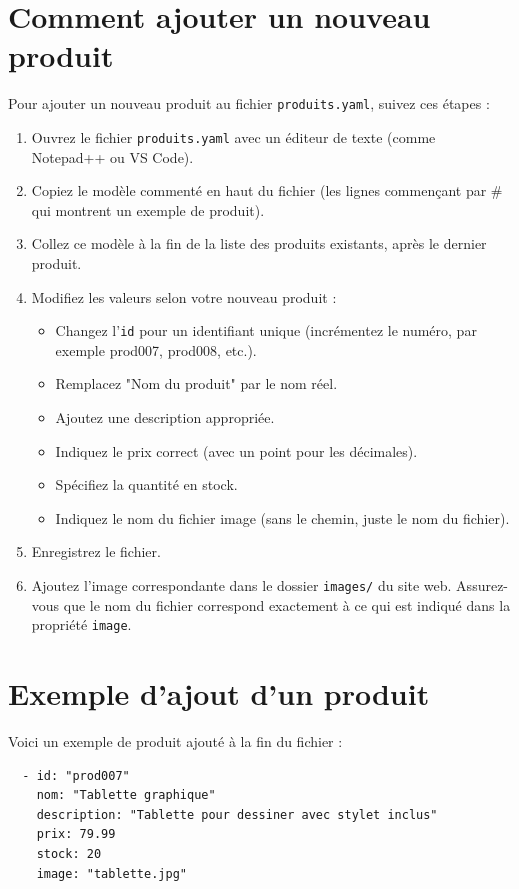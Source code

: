 \documentclass[11pt]{article}
\begin{document}
\section{Comment ajouter un nouveau produit}

Pour ajouter un nouveau produit au fichier \texttt{produits.yaml}, suivez ces étapes :

\begin{enumerate}
\item Ouvrez le fichier \texttt{produits.yaml} avec un éditeur de texte (comme Notepad++ ou VS Code).
\item Copiez le modèle commenté en haut du fichier (les lignes commençant par \# qui montrent un exemple de produit).
\item Collez ce modèle à la fin de la liste des produits existants, après le dernier produit.
\item Modifiez les valeurs selon votre nouveau produit :
  \begin{itemize}
  \item Changez l'\texttt{id} pour un identifiant unique (incrémentez le numéro, par exemple prod007, prod008, etc.).
  \item Remplacez "Nom du produit" par le nom réel.
  \item Ajoutez une description appropriée.
  \item Indiquez le prix correct (avec un point pour les décimales).
  \item Spécifiez la quantité en stock.
  \item Indiquez le nom du fichier image (sans le chemin, juste le nom du fichier).
  \end{itemize}
\item Enregistrez le fichier.
\item Ajoutez l'image correspondante dans le dossier \texttt{images/} du site web. Assurez-vous que le nom du fichier correspond exactement à ce qui est indiqué dans la propriété \texttt{image}.
\end{enumerate}

\section{Exemple d'ajout d'un produit}

Voici un exemple de produit ajouté à la fin du fichier :

\begin{verbatim}
  - id: "prod007"
    nom: "Tablette graphique"
    description: "Tablette pour dessiner avec stylet inclus"
    prix: 79.99
    stock: 20
    image: "tablette.jpg"
\end{verbatim}
\end{document}
